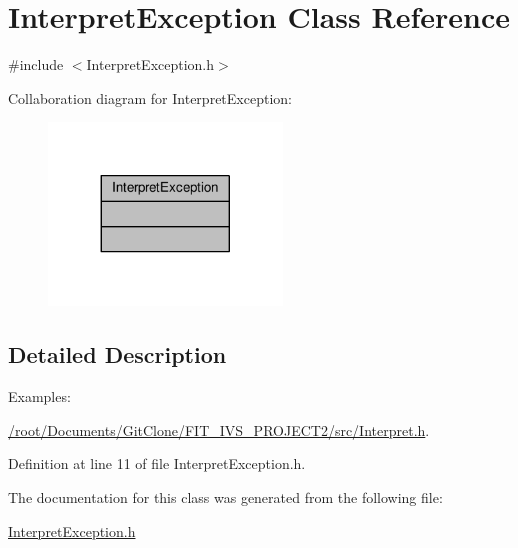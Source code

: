 \hypertarget{class_interpret_exception}{}\section{Interpret\+Exception Class Reference}
\label{class_interpret_exception}


{\ttfamily \#include $<$Interpret\+Exception.\+h$>$}



Collaboration diagram for Interpret\+Exception\+:
\nopagebreak
\begin{figure}[H]
\begin{center}
\leavevmode
\includegraphics[width=176pt]{class_interpret_exception__coll__graph}
\end{center}
\end{figure}


\subsection{Detailed Description}
\begin{Desc}
\item[Examples\+: ]\par
\hyperlink{_2root_2_documents_2_git_clone_2_f_i_t__i_v_s__p_r_o_j_e_c_t2_2src_2_interpret_8h-example}{/root/\+Documents/\+Git\+Clone/\+F\+I\+T\+\_\+\+I\+V\+S\+\_\+\+P\+R\+O\+J\+E\+C\+T2/src/\+Interpret.\+h}.\end{Desc}


Definition at line 11 of file Interpret\+Exception.\+h.



The documentation for this class was generated from the following file\+:\begin{DoxyCompactItemize}
\item 
\hyperlink{_interpret_exception_8h}{Interpret\+Exception.\+h}\end{DoxyCompactItemize}
